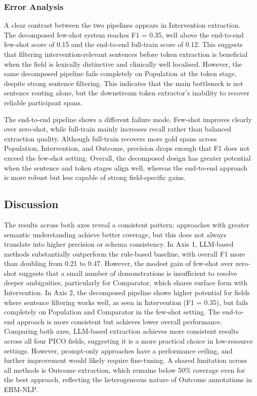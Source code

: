 \documentclass{article}
\begin{document}
\subsubsection{Error Analysis}

A clear contrast between the two pipelines appears in Intervention extraction. The decomposed few-shot system reaches F1 = 0.35, well above the end-to-end few-shot score of 0.15 and the end-to-end full-train score of 0.12. This suggests that filtering intervention-relevant sentences before token extraction is beneficial when the field is lexically distinctive and clinically well localised. However, the same decomposed pipeline fails completely on Population at the token stage, despite strong sentence filtering. This indicates that the main bottleneck is not sentence routing alone, but the downstream token extractor’s inability to recover reliable participant spans.

The end-to-end pipeline shows a different failure mode. Few-shot improves clearly over zero-shot, while full-train mainly increases recall rather than balanced extraction quality. Although full-train recovers more gold spans across Population, Intervention, and Outcome, precision drops enough that F1 does not exceed the few-shot setting. Overall, the decomposed design has greater potential when the sentence and token stages align well, whereas the end-to-end approach is more robust but less capable of strong field-specific gains.


\subsection{Discussion}

The results across both axes reveal a consistent pattern: approaches with greater semantic understanding achieve better coverage, but this does not always translate into higher precision or schema consistency.
In Axis 1, LLM-based methods substantially outperform the rule-based baseline, with overall F1 more than doubling from 0.21 to 0.47. However, the modest gain of few-shot over zero-shot suggests that a small number of demonstrations is insufficient to resolve deeper ambiguities, particularly for Comparator, which shares surface form with Intervention.
In Axis 2, the decomposed pipeline shows higher potential for fields where sentence filtering works well, as seen in Intervention (F1 = 0.35), but fails completely on Population and Comparator in the few-shot setting. The end-to-end approach is more consistent but achieves lower overall performance. Comparing both axes, LLM-based extraction achieves more consistent results across all four PICO fields, suggesting it is a more practical choice in low-resource settings. However, prompt-only approaches have a performance ceiling, and further improvement would likely require fine-tuning.
A shared limitation across all methods is Outcome extraction, which remains below 50\% coverage even for the best approach, reflecting the heterogeneous nature of Outcome annotations in EBM-NLP.
\end{document}

